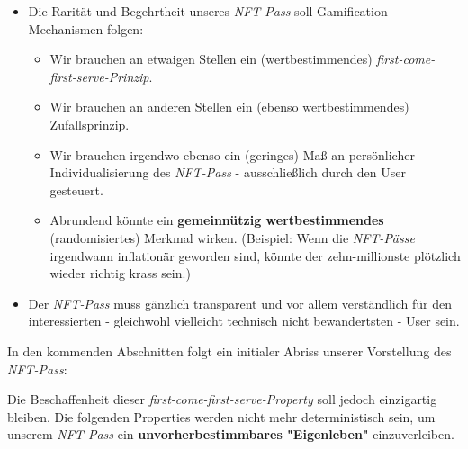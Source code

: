 \begin{itemize}
  \item Die Rarität und Begehrtheit unseres \textit{NFT-Pass} soll Gamification-Mechanismen folgen:
  \begin{itemize}
    \item Wir brauchen an etwaigen Stellen ein (wertbestimmendes) \textit{first-come-first-serve-Prinzip}.
    \item Wir brauchen an anderen Stellen ein (ebenso wertbestimmendes) Zufallsprinzip.
    \item Wir brauchen irgendwo ebenso ein (geringes) Maß an persönlicher Individua\-lisierung des \textit{NFT-Pass} - ausschließlich durch den User gesteuert.
    \item Abrundend könnte ein \textbf{gemeinnützig wertbestimmendes} (randomisiertes) Merkmal wirken. (Beispiel: Wenn die \textit{NFT-Pässe} irgendwann inflationär geworden sind, könnte der zehn-millionste plötzlich wieder richtig krass sein.)
  \end{itemize}
  \item Der \textit{NFT-Pass} muss gänzlich transparent und vor allem verständlich für den interessierten - gleichwohl vielleicht technisch nicht bewandertsten - User sein.
\end{itemize}

\vspace{0.3cm}

In den kommenden Abschnitten folgt ein initialer Abriss unserer Vorstellung des \textit{NFT-Pass}:

\vspace{0.3cm}



Die Beschaffenheit dieser \textit{first-come-first-serve-Property} soll jedoch einzigartig bleiben. Die folgenden Properties werden nicht mehr deterministisch sein, um unserem \textit{NFT-Pass} ein \textbf{unvorherbestimmbares "Eigenleben"} einzuverleiben. 

%



%

% 



\vspace{0.5cm}




